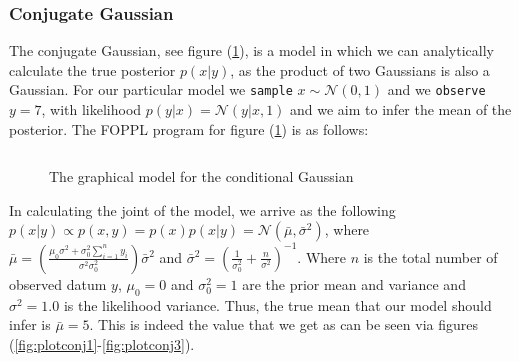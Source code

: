 \documentclass[twoside]{article}
\begin{document}
\subsubsection{Conjugate Gaussian}
The conjugate Gaussian, see figure (\ref{fig:conga}), is a model in which we can analytically calculate the true posterior $p(x | y)$, as the product of two Gaussians is also a Gaussian. For our particular model we \texttt{sample} $x \sim \mathcal{N}(0, 1)$ and we \texttt{observe} $y = 7$, with likelihood $p(y|x) = \mathcal{N}(y | x, 1)$ and we aim to infer the mean of the posterior. The  FOPPL program for figure (\ref{fig:conga}) is as follows:
\inputminted{clojure}{code/conjugategauss.clj}
\begin{figure}[ht]
	\begin{center}
		
	\end{center}
	\caption{The graphical model for the conditional Gaussian}
	\label{fig:conga}
\end{figure}
In calculating the joint of the model, we arrive as the following $ p(x|y) \propto p(x,y) = p(x)p(x| y) = \mathcal{N}(\bar{\mu}, \bar{\sigma}^{2})$, where $\bar{\mu} = \left(\frac{\mu_{0}\sigma^{2} + \sigma^{2}_{0}\sum_{i=1}^{n}y_{i}}{\sigma^{2}\sigma^{2}_{0}}\right) \bar{\sigma}^{2}$ and $\bar{\sigma}^{2} = \left(\frac{1}{\sigma^{2}_{0}} + \frac{n}{\sigma^{2}}\right)^{-1} $. Where $n$ is the total number of observed datum $y$, $\mu_{0} = 0 $ and $\sigma_{0}^{2} = 1$ are the prior mean and variance and $\sigma^{2} = 1.0 $ is the likelihood variance. Thus, the true mean that our model should infer is $\bar{\mu} = 5$. This is indeed the value that we get as can be seen via figures (\ref{fig:plotconj1}-\ref{fig:plotconj3}).
\end{document}
